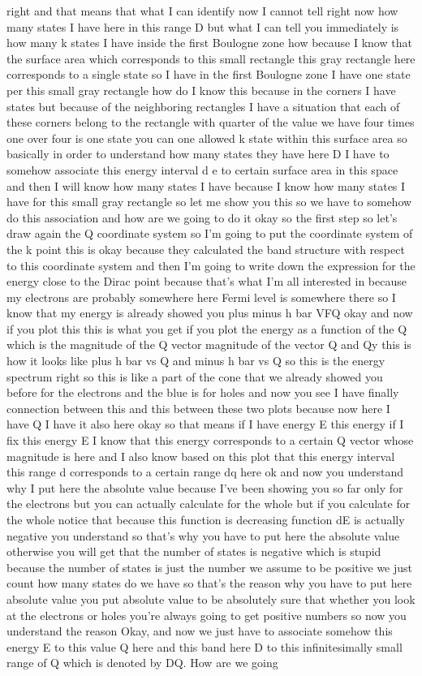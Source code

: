 right and that means that what I can identify now I cannot tell right now how many states I have here in this range D but what I can tell you immediately is how many k states I have inside the first Boulogne zone how because I know that the surface area which corresponds to this small rectangle this gray rectangle here corresponds to a single state so I have in the first Boulogne zone I have one state per this small gray rectangle how do I know this because in the corners I have states but because of the neighboring rectangles I have a situation that each of these corners belong to the rectangle with quarter of the value we have four times one over four is one state you can one allowed k state within this surface area so basically in order to understand how many states they have here D I have to somehow associate this energy interval d e to certain surface area in this space and then I will know how many states I have because I know how many states I have for this small gray rectangle so let me show you this so we have to somehow do this association and how are we going to do it okay so the first step so let's draw again the Q coordinate system so I'm going to put the coordinate system of the k point this is okay because they calculated the band structure with respect to this coordinate system and then I'm going to write down the expression for the energy close to the Dirac point because that's what I'm all interested in because my electrons are probably somewhere here Fermi level is somewhere there so I know that my energy is already showed you plus minus h bar VFQ okay and now if you plot this this is what you get if you plot the energy as a function of the Q which is the magnitude of the Q vector magnitude of the vector Q and Qy this is how it looks like plus h bar vs Q and minus h bar vs Q so this is the energy spectrum right so this is like a part of the cone that we already showed you before for the electrons and the blue is for holes and now you see I have finally connection between this and this between these two plots because now here I have Q I have it also here okay so that means if I have energy E this energy if I fix this energy E I know that this energy corresponds to a certain Q vector whose magnitude is here and I also know based on this plot that this energy interval this range d corresponds to a certain range dq here ok and now you understand why I put here the absolute value because I've been showing you so far only for the electrons but you can actually calculate for the whole but if you calculate for the whole notice that because this function is decreasing function dE is actually negative you understand so that's why you have to put here the absolute value otherwise you will get that the number of states is negative which is stupid because the number of states is just the number we assume to be positive we just count how many states do we have so that's the reason why you have to put here absolute value you put absolute value to be absolutely sure that whether you look at the electrons or holes you're always going to get positive numbers so now you understand the reason Okay, and now we just have to associate somehow this energy E to this value Q here and this band here D to this infinitesimally small range of Q which is denoted by DQ. How are we going 